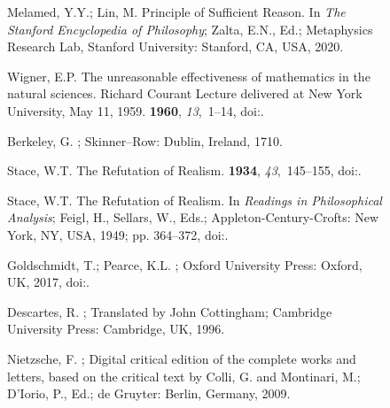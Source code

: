 \documentclass[entropy,article,accept,oneauthor,pdftex]{Definitions/mdpi}
\begin{document}
\begin{figure}[H]
\begin{thebibliography}{999}
Melamed, Y.Y.; Lin, M.
\newblock Principle of Sufficient Reason. In {\em The {}Stanford Encyclopedia
  of Philosophy};  Zalta, E.N., Ed.; Metaphysics Research Lab, Stanford University: Stanford, CA, USA, 2020.

Wigner, E.P.
\newblock The unreasonable effectiveness of mathematics in the natural
  sciences. {R}ichard {C}ourant {L}ecture delivered at {N}ew {Y}ork
  {U}niversity, {M}ay 11, 1959.
 {\bf 1960}, {\em 13},~1--14, doi:{\href{https://doi.org/10.1002/cpa.3160130102}{}}.

Berkeley, G.
;  Skinner--Row: Dublin, Ireland, 1710.

Stace, W.T.
\newblock The Refutation of Realism.
 {\bf 1934}, {\em 43},~145--155, doi:{\href{https://doi.org/10.1093/mind/XLIII.170.145}{}}.

Stace, W.T.
\newblock The Refutation of Realism. In {\em Readings in Philosophical
  Analysis}; Feigl, H., Sellars, W., Eds.; Appleton-Century-Crofts: New York, NY, USA, 1949; pp. 364--372, doi:{\href{https://doi.org/10.1093/mind/xliii.170.145}{}}.

Goldschmidt, T.; Pearce, K.L.
; Oxford University Press: Oxford, UK,  2017, doi:{\href{https://doi.org/10.1093/oso/9780198746973.001.0001}{}}.

Descartes, R.
; Translated by John Cottingham; Cambridge University Press: Cambridge, UK, 1996.%

Nietzsche, F.
; Digital critical edition of the complete works and letters, based on
  the critical text by Colli, G. and Montinari, M.; D'Iorio, P., Ed.; de Gruyter: Berlin, Germany, 2009.%


\end{thebibliography}
\end{figure}
\end{document}
